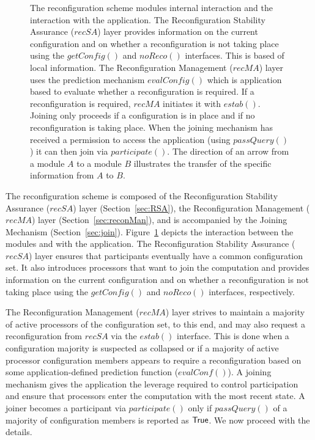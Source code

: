 \documentclass[11pt]{article}
\newcommand{\noReconfig}{noReco}
\newcommand{\configEstab}{estab}
\begin{document}
\begin{figure}[t!]
\caption{
The reconfiguration scheme modules internal interaction and the interaction with the application. 
The Reconfiguration Stability Assurance ($recSA$) layer provides information on the current configuration and on whether a reconfiguration is not taking place using the $getConfig()$ and $\noReconfig()$ interfaces.
This is based of local information.
The Reconfiguration Management ($recMA$) layer uses the prediction mechanism $evalConfig()$ which is application based to evaluate whether a reconfiguration is required.
If a reconfiguration is required, $recMA$ initiates it with $\configEstab()$.
Joining only proceeds if a configuration is in place and if no reconfiguration is taking place.
When the joining mechanism has received a permission to access the application (using  $passQuery()$) it can then join via $participate()$.
The direction of an arrow from a module $A$ to a module $B$ illustrates the transfer of the specific information from $A$ to $B$.
}

\label{fig:modules}
\end{figure}

The reconfiguration scheme is composed of the Reconfiguration Stability Assurance ($recSA$) layer (Section~\ref{sec:RSA}), the Reconfiguration Management ($recMA$) layer (Section~\ref{sec:reconMan}), and is accompanied by the Joining Mechanism (Section~\ref{sec:join}).
Figure~\ref{fig:modules} depicts the interaction between the modules and with the application. 
The Reconfiguration Stability Assurance ($recSA$) layer ensures that participants eventually have a common configuration set.
It also introduces processors that want to join the computation and provides information on the current configuration and on whether a reconfiguration is not taking place using the $getConfig()$ and $\noReconfig()$ interfaces, respectively.

The Reconfiguration Management ($recMA$) layer strives to maintain a majority of active processors of the configuration set, to this end, and may also request a reconfiguration from $recSA$ via the $estab()$ interface. 
This is done when a configuration majority is suspected as collapsed or if a majority of active processor configuration members appears to require a reconfiguration based on some application-defined prediction function ($evalConf()$).
A joining mechanism gives the application the leverage required to control participation and ensure that processors enter the computation with the most recent state.
A joiner becomes a participant via $participate()$ only if $passQuery()$ of a majority of configuration members is reported as $\sf True$. 
We now proceed with the details. 
\end{document}
